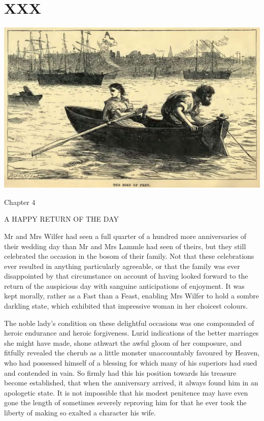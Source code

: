 
\chapter{XXX}

\includegraphics[scale=2.3]{01-01-01}

Chapter 4

A HAPPY RETURN OF THE DAY


Mr and Mrs Wilfer had seen a full quarter of a hundred more
anniversaries of their wedding day than Mr and Mrs Lammle had seen of
theirs, but they still celebrated the occasion in the bosom of
their family. Not that these celebrations ever resulted in anything
particularly agreeable, or that the family was ever disappointed by that
circumstance on account of having looked forward to the return of the
auspicious day with sanguine anticipations of enjoyment. It was kept
morally, rather as a Fast than a Feast, enabling Mrs Wilfer to hold
a sombre darkling state, which exhibited that impressive woman in her
choicest colours.

The noble lady’s condition on these delightful occasions was one
compounded of heroic endurance and heroic forgiveness. Lurid indications
of the better marriages she might have made, shone athwart the awful
gloom of her composure, and fitfully revealed the cherub as a little
monster unaccountably favoured by Heaven, who had possessed himself of a
blessing for which many of his superiors had sued and contended in vain.
So firmly had this his position towards his treasure become established,
that when the anniversary arrived, it always found him in an apologetic
state. It is not impossible that his modest penitence may have even gone
the length of sometimes severely reproving him for that he ever took the
liberty of making so exalted a character his wife.

